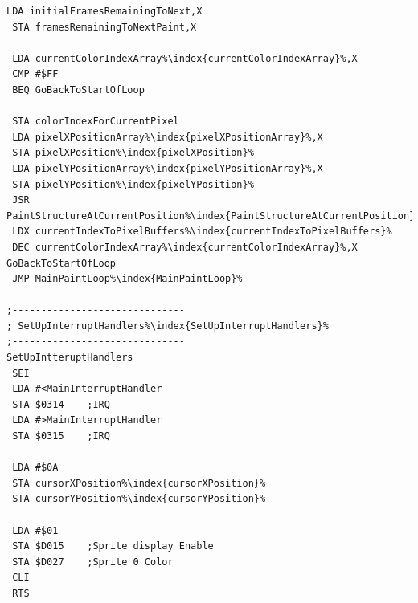 \begin{minipage}[b]{0.33\linewidth}
\begin{lrbox}{\mybox}
\begin{lstlisting}[basicstyle=\ttfamily\tiny,escapechar=\%]
 LDA initialFramesRemainingToNext,X
 STA framesRemainingToNextPaint,X

 LDA currentColorIndexArray%\index{currentColorIndexArray}%,X
 CMP #$FF
 BEQ GoBackToStartOfLoop

 STA colorIndexForCurrentPixel
 LDA pixelXPositionArray%\index{pixelXPositionArray}%,X
 STA pixelXPosition%\index{pixelXPosition}%
 LDA pixelYPositionArray%\index{pixelYPositionArray}%,X
 STA pixelYPosition%\index{pixelYPosition}%
 JSR PaintStructureAtCurrentPosition%\index{PaintStructureAtCurrentPosition}%
 LDX currentIndexToPixelBuffers%\index{currentIndexToPixelBuffers}%
 DEC currentColorIndexArray%\index{currentColorIndexArray}%,X
GoBackToStartOfLoop   
 JMP MainPaintLoop%\index{MainPaintLoop}%

;------------------------------
; SetUpInterruptHandlers%\index{SetUpInterruptHandlers}%
;------------------------------
SetUpIntteruptHandlers   
 SEI 
 LDA #<MainInterruptHandler
 STA $0314    ;IRQ
 LDA #>MainInterruptHandler
 STA $0315    ;IRQ

 LDA #$0A
 STA cursorXPosition%\index{cursorXPosition}%
 STA cursorYPosition%\index{cursorYPosition}%

 LDA #$01
 STA $D015    ;Sprite display Enable
 STA $D027    ;Sprite 0 Color
 CLI 
 RTS 

\end{lstlisting}
\end{lrbox}%
\scalebox{0.8}{\usebox{\mybox}}
\end{minipage}
\hspace{-0.1cm}
